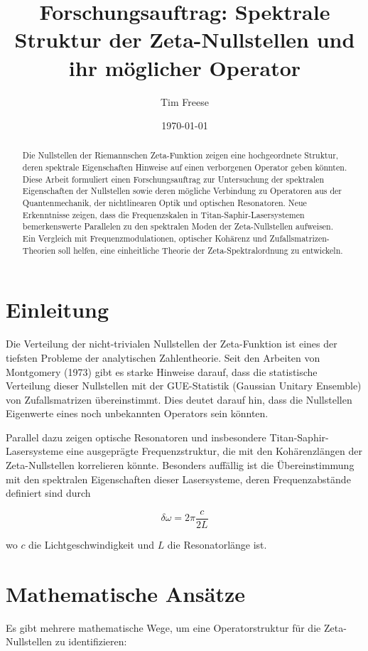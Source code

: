 \documentclass[a4paper,12pt]{article}
\title{Forschungsauftrag: Spektrale Struktur der Zeta-Nullstellen und ihr möglicher Operator}
\author{Tim Freese}
\date{\today}
\begin{document}
\maketitle

\begin{abstract}
Die Nullstellen der Riemannschen Zeta-Funktion zeigen eine hochgeordnete Struktur, deren spektrale Eigenschaften Hinweise auf einen verborgenen Operator geben könnten. Diese Arbeit formuliert einen Forschungsauftrag zur Untersuchung der spektralen Eigenschaften der Nullstellen sowie deren mögliche Verbindung zu Operatoren aus der Quantenmechanik, der nichtlinearen Optik und optischen Resonatoren. Neue Erkenntnisse zeigen, dass die Frequenzskalen in Titan-Saphir-Lasersystemen bemerkenswerte Parallelen zu den spektralen Moden der Zeta-Nullstellen aufweisen. Ein Vergleich mit Frequenzmodulationen, optischer Kohärenz und Zufallsmatrizen-Theorien soll helfen, eine einheitliche Theorie der Zeta-Spektralordnung zu entwickeln.
\end{abstract}

\section{Einleitung}
Die Verteilung der nicht-trivialen Nullstellen der Zeta-Funktion ist eines der tiefsten Probleme der analytischen Zahlentheorie. Seit den Arbeiten von Montgomery (1973) gibt es starke Hinweise darauf, dass die statistische Verteilung dieser Nullstellen mit der GUE-Statistik (Gaussian Unitary Ensemble) von Zufallsmatrizen übereinstimmt. Dies deutet darauf hin, dass die Nullstellen Eigenwerte eines noch unbekannten Operators sein könnten.

Parallel dazu zeigen optische Resonatoren und insbesondere Titan-Saphir-Lasersysteme eine ausgeprägte Frequenzstruktur, die mit den Kohärenzlängen der Zeta-Nullstellen korrelieren könnte. Besonders auffällig ist die Übereinstimmung mit den spektralen Eigenschaften dieser Lasersysteme, deren Frequenzabstände definiert sind durch 

\begin{equation}
\delta\omega = 2\pi \frac{c}{2L}
\end{equation}

wo \( c \) die Lichtgeschwindigkeit und \( L \) die Resonatorlänge ist.

\section{Mathematische Ansätze}
Es gibt mehrere mathematische Wege, um eine Operatorstruktur für die Zeta-Nullstellen zu identifizieren:
\end{document}
